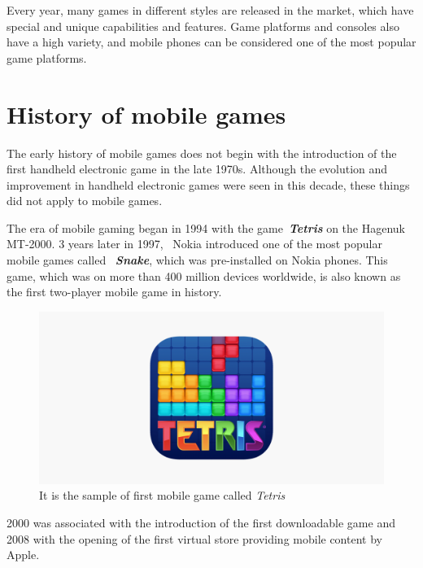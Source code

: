 \documentclass[10pt,a4paper]{article}
\begin{document}
Every year, many games in different styles are released in the market, which have special and unique capabilities and features. Game platforms and consoles also have a high variety, and mobile phones can be considered one of the most popular game platforms.


\section{History of mobile games} \label{history mobile games}%
The early history of mobile games does not begin with the introduction of the first handheld electronic game in the late 1970s. Although the evolution and improvement in handheld electronic games were seen in this decade, these things did not apply to mobile games.

The era of mobile gaming began in 1994 with the game~\textit{\textbf{Tetris}} on the Hagenuk MT-2000. 3 years later in 1997,~\cite{mayra2015mobile} Nokia introduced one of the most popular mobile games called ~\textit{\textbf{Snake}}, which was pre-installed on Nokia phones. This game, which was on more than 400 million devices worldwide, is also known as the first two-player mobile game in history.

\begin{figure}[h]%
    \centering
    \includegraphics[width=.6\textwidth]{Tetris.png}
    \caption{It is the  sample of first mobile game called \textit{Tetris}}
    \label{fig:Tetris}
\end{figure}

2000 was associated with the introduction of the first downloadable game and 2008 with the opening of the first virtual store providing mobile content by Apple.
\end{document}
